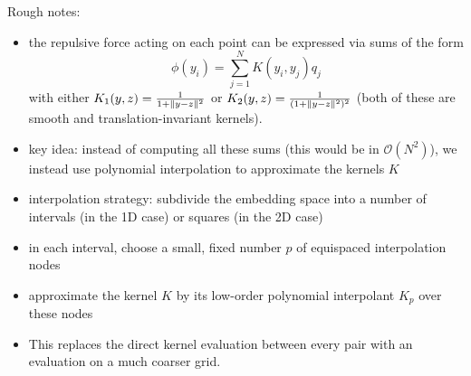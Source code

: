 Rough notes: 
\begin{itemize}
    \item the repulsive force acting on each point can be expressed via sums of the form \begin{equation}
        \phi(y_i) = \sum_{j=1}^N K(y_i, y_j) q_j 
    \end{equation}
    with either $K_1(y,z) = \frac{1}{1+\lVert y-z\rVert^2}$ or $K_2(y,z) = \frac{1}{(1+\lVert y-z\rVert^2)^2}$ (both of these are smooth and translation-invariant kernels). 
    \item key idea: instead of computing all these sums (this would be in $\mathcal{O}(N^2)$), we instead use polynomial interpolation to approximate the kernels $K$ 
    \item interpolation strategy: subdivide the embedding space into a number of intervals (in the 1D case) or squares (in the 2D case)
    \item in each interval, choose a small, fixed number $p$ of equispaced interpolation nodes 
    \item approximate the kernel $K$ by its low-order polynomial interpolant $K_p$ over these nodes 
    \item This replaces the direct kernel evaluation between every pair with an evaluation on a much coarser grid.
\end{itemize}


